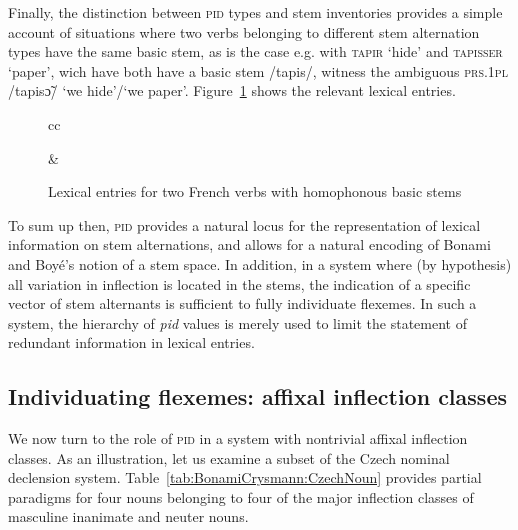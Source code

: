 \documentclass[output=paper]{langsci/langscibook}
\begin{document}
\largerpage 
Finally, the distinction between \textsc{pid} types and stem inventories provides a simple account of situations where two verbs belonging to different stem alternation types have the same basic stem, as is the case e.g. with \textsc{tapir} `hide' and \textsc{tapisser} `paper', wich have both have a basic stem /tapis/, witness the ambiguous \textsc{prs.1pl} /tapisɔ̃/ `we hide'/`we paper'. Figure~\ref{fig:BonamiCrysmann:tapis} shows the relevant lexical entries.
\newpage 

\begin{figure}[t]
\centering\smaller
\begin{tabular}{cc}
&
\end{tabular}
\caption{Lexical entries for two French verbs with homophonous basic stems\label{fig:BonamiCrysmann:tapis}}
\end{figure}


  
To sum up then, \textsc{pid} provides a natural locus for the
representation of lexical information on stem alternations, and allows
for a natural encoding of Bonami and Boyé's notion of a stem space. In
addition, in a system where (by hypothesis) all variation in
inflection is located in the stems, the indication of a specific
vector of stem alternants is sufficient to fully individuate
flexemes. In such a system, the hierarchy of \textit{pid} values is
merely used to limit the statement of redundant information in lexical
entries.

\subsection{Individuating flexemes: affixal inflection classes}
\label{sec:3:4}

We now turn to the role of \textsc{pid}  in a system with
nontrivial affixal inflection classes. As an illustration, let us
examine a subset of the Czech nominal declension
system. Table~\ref{tab:BonamiCrysmann:CzechNoun} provides partial paradigms for four
nouns belonging to four of the major inflection classes of masculine
inanimate and neuter nouns.
\end{document}
